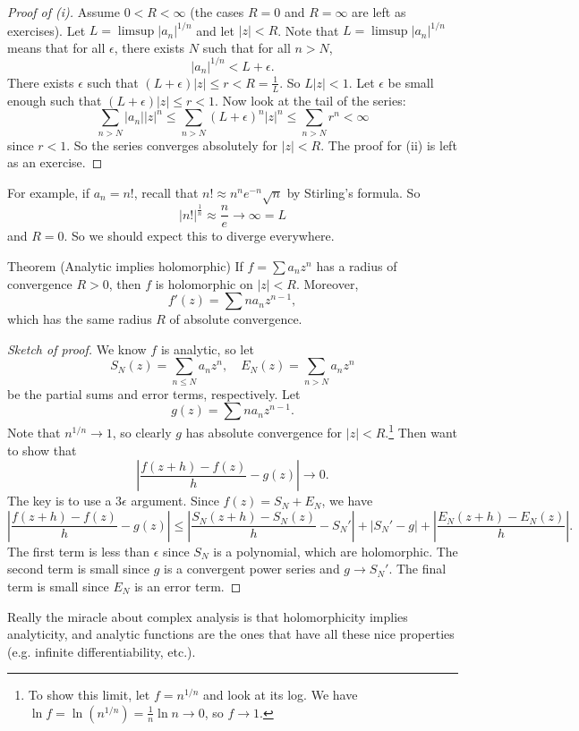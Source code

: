 \begin{proof}[Proof of (i)]
  Assume $0 < R < \infty$ (the cases $R = 0$ and
  $R = \infty$ are left as exercises). Let
  $L = \limsup |a_n|^{1 / n}$ and let $|z| < R$.
  Note that $L = \limsup |a_n|^{1 / n}$ means that for
  all $\epsilon$, there exists $N$ such that
  for all $n > N$,
  \[
    |a_n|^{1 / n} < L + \epsilon
  .\]
  There exists $\epsilon$ such that
  $(L + \epsilon)|z| \le r < R = \frac{1}{L}$.
  So $L|z| < 1$. Let $\epsilon$ be small enough such
  that $(L + \epsilon)|z| \le r < 1$.
  Now look at the tail of the series:
  \[
    \sum_{n > N} |a_n| |z|^n
    \le \sum_{n > N} (L + \epsilon)^n |z|^n
    \le \sum_{n > N} r^n < \infty
  \]
  since $r < 1$. So the series converges absolutely
  for $|z| < R$.
  The proof for (ii) is left as an exercise.
\end{proof}

For example, if $a_n = n!$, recall that
$n! \approx n^n e^{-n} \sqrt{n}$ by Stirling's formula.
So
\[
  \left|n!\right|^{\frac{1}{n}}
  \approx \frac{n}{e} \to \infty = L
\]
and $R = 0$. So we should expect this to diverge
everywhere.

\begin{thm}{Theorem (Analytic implies holomorphic)}
  If $f = \sum a_n z^n$ has a radius of convergence
  $R > 0$, then $f$ is holomorphic on $|z| < R$.
  Moreover,
  \[
    f'(z) = \sum n a_n z^{n - 1}
  ,\]
  which has the same radius $R$ of absolute convergence.
\end{thm}

\begin{proof}[Sketch of proof]
  We know $f$ is analytic, so let
  \[S_N(z) = \sum_{n \le N} a_n z^n, \quad E_N(z) = \sum_{n > N} a_n z^n\]
  be the partial sums and error terms, respectively.
  Let
  \[
    g(z) = \sum n a_n z^{n - 1}
  .\]
  Note that $n^{1 / n} \to 1$, so clearly $g$ has
  absolute convergence for $|z| < R$.\footnote{
    To show this limit, let $f = n^{1 / n}$ and look at
    its log. We have
    $\ln f = \ln(n^{1 / n}) = \frac{1}{n} \ln n \to 0$,
    so $f \to 1$.
  }
  Then want to
  show that
  \[
    \left|\frac{f(z + h) - f(z)}{h} - g(z)\right| \to 0
  .\]
  The key is to use a $3\epsilon$ argument.
  Since $f(z) = S_N + E_N$, we have
  \[
    \left|\frac{f(z + h) - f(z)}{h} - g(z)\right|
    \le \left|\frac{S_N(z + h) - S_N(z)}{h} - S_N'\right|
    + |S_N' - g| + \left|\frac{E_N(z + h) - E_N(z)}{h}\right|
  .\]
  The first term is less than $\epsilon$ since
  $S_N$ is a polynomial, which are holomorphic.
  The second term is small since $g$ is a convergent
  power series and $g \to S_N'$. The final term is
  small since $E_N$ is an error term.
\end{proof}

\begin{remark}
  Really the miracle about complex analysis is
  that holomorphicity implies analyticity, and analytic
  functions are the ones that have all these nice
  properties (e.g. infinite differentiability, etc.).
\end{remark}
